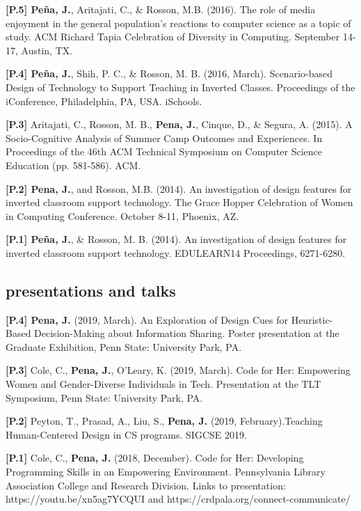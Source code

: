 \documentclass[]{cv-style}          %
\begin{document}
{\textbf{[P.5] Peña, J.}, Aritajati, C., \& Rosson, M.B. (2016). The role of media enjoyment in the general population’s reactions to computer science as a topic of study. ACM Richard Tapia Celebration of Diversity in Computing. September 14-17, Austin, TX.}

{\textbf{[P.4] Peña, J.}, Shih, P. C., \& Rosson, M. B. (2016, March). Scenario-based Design of Technology to Support Teaching in Inverted Classes. Proceedings of the iConference, Philadelphia, PA, USA. iSchools. {}}

{\textbf{[P.3]} Aritajati, C., Rosson, M. B., {\textbf{Pena, J.}}, Cinque, D., \& Segura, A. (2015). A Socio-Cognitive Analysis of Summer Camp Outcomes and Experiences. In Proceedings of the 46th ACM Technical Symposium on Computer Science Education (pp. 581-586). ACM.}

{\textbf{[P.2] Pena, J.}, and Rosson, M.B. (2014). An investigation of design features for inverted classroom support technology. The Grace Hopper Celebration of Women in Computing Conference. October 8-11, Phoenix, AZ. {}}

{\textbf{[P.1] Peña, J.}, \& Rosson, M. B. (2014). An investigation of design features for inverted classroom support technology. EDULEARN14 Proceedings, 6271-6280.}

\subsection{presentations and talks}
{\textbf{[P.4] Pena, J.} (2019, March). An Exploration of Design Cues for Heuristic-Based Decision-Making about Information Sharing. Poster presentation at the Graduate Exhibition, Penn State: University Park, PA. }

{\textbf{[P.3]} Cole, C., {\textbf{Pena, J.}}, O'Leary, K. (2019, March). Code for Her: Empowering Women and Gender-Diverse Individuals in Tech. Presentation at the TLT Symposium, Penn State: University Park, PA. }

{\textbf{[P.2]} Peyton, T., Prasad, A., Liu, S., {\textbf{Pena, J.}} (2019, February).Teaching Human-Centered Design in CS programs. SIGCSE 2019. {}}

{\textbf{[P.1]} Cole, C., {\textbf{Pena, J.}} (2018, December). Code for Her: Developing Programming Skills in an Empowering Environment. Pennsylvania Library Association College and Research Division.{} 
Links to presentation: https://youtu.be/xn5ag7YCQUI and
https://crdpala.org/connect-communicate/}
\end{document}
